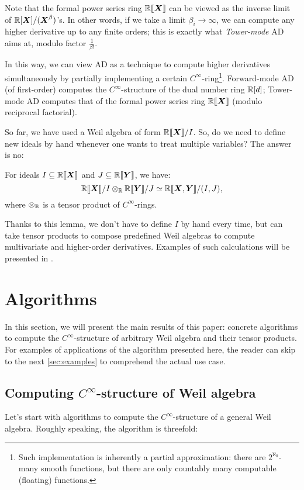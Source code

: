 \documentclass[runningheads]{llncs}
\begin{document}
Note that the formal power series ring $\mathord{\mathbb{R}\llbracket\boldsymbol{X}\rrbracket}$ can be viewed as the inverse limit of $\mathbb{R}[\boldsymbol{X}]/(\boldsymbol{X}^\beta)$'s.
In other words, if we take a limit $\beta_i \to \infty$, we can compute any higher derivative up to any finite orders; this is exactly what \emph{Tower-mode} AD aims at, modulo factor $\frac{1}{\beta!}$.

In this way, we can view AD as a technique to compute higher derivatives simultaneously by partially implementing a certain $C^\infty$-ring\footnote{Such implementation is inherently a partial approximation: there are $2^{\aleph_0}$-many smooth functions, but there are only countably many computable (floating) functions.}.
Forward-mode AD (of first-order) computes the $C^\infty$-structure of the dual number ring $\mathbb{R}[d]$; Tower-mode AD computes that of the formal power series ring $\mathord{\mathbb{R}\llbracket\boldsymbol{X}\rrbracket}$ (modulo reciprocal factorial).

So far, we have used a Weil algebra of form $\mathord{\mathbb{R}\llbracket\boldsymbol{X}\rrbracket}/I$.
So, do we need to define new ideals by hand whenever one wants to treat multiple variables?
The answer is no:

\begin{lemma}
  \label{thm:quot-tensor}
  For ideals $I \subseteq \mathbb{R}\llbracket\boldsymbol{X}\rrbracket$ and $J \subseteq \mathbb{R}\llbracket{}\boldsymbol{Y}\rrbracket$, we have:
  \[
    \mathord{\mathbb{R}\llbracket\boldsymbol{X}\rrbracket}/I \otimes_{\mathbb{R}} \mathbb{R}\llbracket{}\boldsymbol{Y}\rrbracket/J \simeq
    \mathbb{R}\llbracket{}\boldsymbol{X}, \boldsymbol{Y}\rrbracket/(I, J),
  \]
  where $\otimes_{\mathbb{R}}$ is a tensor product of $C^\infty$-rings.
\end{lemma}
Thanks to this lemma, we don't have to define $I$ by hand every time, but can take tensor products to compose predefined Weil algebras to compute multivariate and higher-order derivatives.
Examples of such calculations will be presented in .

\section{Algorithms}\label{sec:alg}
In this section, we will present the main results of this paper: concrete algorithms to compute the $C^\infty$-structure of arbitrary Weil algebra and their tensor products.
For examples of applications of the algorithm presented here, the reader can skip to the next \cref{sec:examples} to comprehend the actual use case.

\subsection{Computing $C^\infty$-structure of Weil algebra}
\label{sec:general-weil-algs}
Let's start with algorithms to compute the $C^\infty$-structure of a general Weil algebra.
Roughly speaking, the algorithm is threefold:
\end{document}
